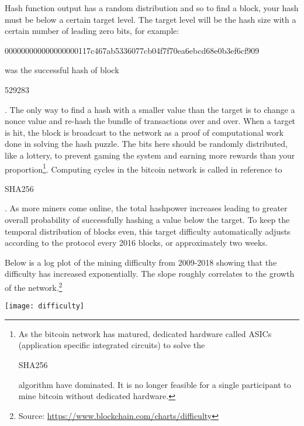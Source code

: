  Hash function output has a random distribution and so to find a block, your hash must be below a certain target level. The target level will be the hash size with a certain number of leading zero bits, for example:\begin{center}\begin{code}
	000000000000000000117c467ab5336077cb04f7f70ea6ebcd68e0b3ef6cf909
\end{code}\end{center} 
was the successful hash of block \begin{code}529283\end{code}. The only way to find a hash with a smaller value than the target is to change a nonce value and re-hash the bundle of transactions over and over. When a target is hit, the block is broadcast to the network as a proof of computational work done in solving the hash puzzle. 
The bits here should be randomly distributed, like a lottery, to prevent gaming the system and earning more rewards than your proportion\footnote{As the bitcoin network has matured, dedicated hardware called ASICs (application specific integrated circuits) to solve the \begin{code}SHA256\end{code} algorithm have dominated. It is no longer feasible for a single participant to mine bitcoin without dedicated hardware.}. Computing cycles in the bitcoin network is called  in reference to \begin{code}SHA256\end{code}. As more miners come online, the total hashpower increases leading to greater overall probability of successfully hashing a value below the target. To keep the temporal distribution of blocks even, this target difficulty automatically adjusts according to the protocol every 2016 blocks, or approximately two weeks.

Below is a log plot of the mining difficulty from 2009-2018 showing that the difficulty has increased exponentially. The slope roughly correlates to the growth of the network.\footnote{Source: \url{https://www.blockchain.com/charts/difficulty}}

\begin{center}\vspace{0.3cm}
	\texttt{[image: difficulty]}
\end{center}

